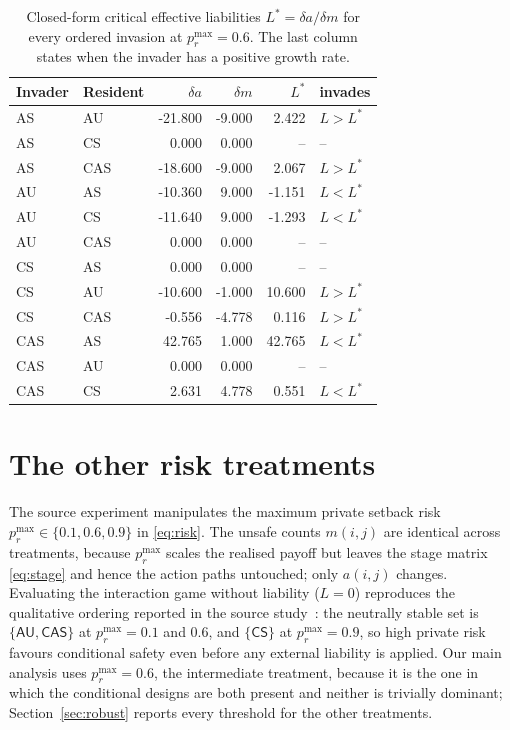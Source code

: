 \documentclass[pdflatex]{sn-jnl}
\theoremstyle{thmstyleone}
\theoremstyle{thmstylethree}
\theoremstyle{thmstyletwo}
\newcommand{\AU}{\textsf{AU}}
\newcommand{\CS}{\textsf{CS}}
\newcommand{\CAS}{\textsf{CAS}}
\begin{document}
\begin{appendices}
\begin{table}[htbp]
\centering
\caption{Closed-form critical effective liabilities $L^{*}=\delta a/\delta m$ for every ordered invasion at $p_r^{\max}=0.6$. The last column states when the invader has a positive growth rate.}
\label{tab:thresholds}
\begin{tabular}{llrrrl}
\toprule
Invader & Resident & $\delta a$ & $\delta m$ & $L^{*}$ & invades \\
\midrule
AS & AU & -21.800 & -9.000 & 2.422 & $L>L^*$ \\
AS & CS & 0.000 & 0.000 & -- & -- \\
AS & CAS & -18.600 & -9.000 & 2.067 & $L>L^*$ \\
AU & AS & -10.360 & 9.000 & -1.151 & $L<L^*$ \\
AU & CS & -11.640 & 9.000 & -1.293 & $L<L^*$ \\
AU & CAS & 0.000 & 0.000 & -- & -- \\
CS & AS & 0.000 & 0.000 & -- & -- \\
CS & AU & -10.600 & -1.000 & 10.600 & $L>L^*$ \\
CS & CAS & -0.556 & -4.778 & 0.116 & $L>L^*$ \\
CAS & AS & 42.765 & 1.000 & 42.765 & $L<L^*$ \\
CAS & AU & 0.000 & 0.000 & -- & -- \\
CAS & CS & 2.631 & 4.778 & 0.551 & $L<L^*$ \\
\bottomrule
\end{tabular}
\end{table}

\section{The other risk treatments}\label{app:treatments}

The source experiment manipulates the maximum private setback risk
$p_r^{\max}\in\{0.1,0.6,0.9\}$ in \eqref{eq:risk}. The unsafe counts $m(i,j)$
are identical across treatments, because $p_r^{\max}$ scales the realised
payoff but leaves the stage matrix \eqref{eq:stage} and hence the action paths
untouched; only $a(i,j)$ changes. Evaluating the interaction game without
liability ($L=0$) reproduces the qualitative ordering reported in the source
study~\citep{domingos2026falling}: the neutrally stable set is
$\{\AU,\CAS\}$ at $p_r^{\max}=0.1$ and $0.6$, and $\{\CS\}$ at
$p_r^{\max}=0.9$, so high private risk favours conditional safety even before
any external liability is applied. Our main analysis uses $p_r^{\max}=0.6$,
the intermediate treatment, because it is the one in which the conditional
designs are both present and neither is trivially dominant;
Section~\ref{sec:robust} reports every threshold for the other treatments.

\end{appendices}


\end{document}
